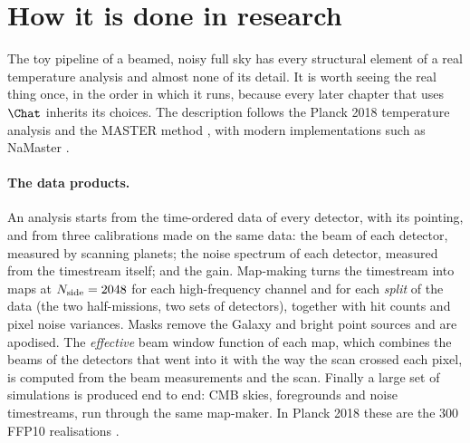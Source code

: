 \section{How it is done in research}
\label{8a:sec:research}

The toy pipeline of a beamed, noisy full sky has every structural element of a real temperature analysis
and almost none of its detail. It is worth seeing the real thing once, in the order in which
it runs, because every later chapter that uses $\Chat$ inherits its choices. The description
follows the Planck 2018 temperature analysis \cite{Planck2018V} and the MASTER method
, with modern implementations such as NaMaster \cite{Alonso2019}.

\paragraph{The data products.}
An analysis starts from the time-ordered data of every detector, with its pointing, and from
three calibrations made on the same data: the beam of each detector, measured by scanning
planets; the noise spectrum of each detector, measured from the timestream itself; and the
gain. Map-making turns the timestream into maps at $N_{\rm side}=2048$ for each high-frequency channel and
for each \emph{split} of the data (the two half-missions, two sets of detectors), together with
hit counts and pixel noise variances. Masks remove the Galaxy and bright point sources and
are apodised. The \emph{effective} beam window function of each map, which combines the beams of
the detectors that went into it with the way the scan crossed each pixel, is computed from
the beam measurements and the scan. Finally a large set of simulations is produced end to
end: CMB skies, foregrounds and noise timestreams, run through the same map-maker. In Planck
2018 these are the $300$ FFP10 realisations \cite{Planck2018V}.

